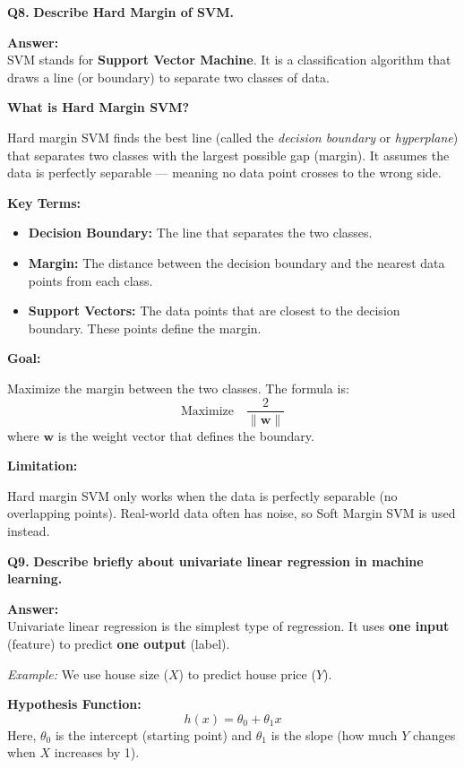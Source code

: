 \documentclass[12pt,a4paper]{article}
\newcommand{\question}[2]{%
    \begin{mdframed}[style=questionstyle]
        \textbf{\textcolor{headerblue}{Q#1.}} \textbf{#2}
    \end{mdframed}%
    \vspace{2pt}%
}
\newcommand{\ans}{\textbf{\textcolor{headerblue}{Answer:}}\\[4pt]}
\newcommand{\subhead}[1]{\textbf{\textcolor{headerblue}{#1}}}
\begin{document}
\vspace{10pt}
\question{8}{Describe Hard Margin of SVM.}

\ans

SVM stands for \textbf{Support Vector Machine}. It is a classification algorithm that draws a line (or boundary) to separate two classes of data.

\subhead{What is Hard Margin SVM?}

Hard margin SVM finds the best line (called the \textit{decision boundary} or \textit{hyperplane}) that separates two classes with the largest possible gap (margin). It assumes the data is perfectly separable --- meaning no data point crosses to the wrong side.

\subhead{Key Terms:}
\begin{itemize}[leftmargin=*]
    \item \textbf{Decision Boundary:} The line that separates the two classes.
    \item \textbf{Margin:} The distance between the decision boundary and the nearest data points from each class.
    \item \textbf{Support Vectors:} The data points that are closest to the decision boundary. These points define the margin.
\end{itemize}

\subhead{Goal:}

Maximize the margin between the two classes. The formula is:
\[
\text{Maximize} \quad \frac{2}{\|\mathbf{w}\|}
\]
where $\mathbf{w}$ is the weight vector that defines the boundary.

\subhead{Limitation:}

Hard margin SVM only works when the data is perfectly separable (no overlapping points). Real-world data often has noise, so Soft Margin SVM is used instead.

\vspace{10pt}
\question{9}{Describe briefly about univariate linear regression in machine learning.}

\ans

Univariate linear regression is the simplest type of regression. It uses \textbf{one input} (feature) to predict \textbf{one output} (label).

\textit{Example:} We use house size ($X$) to predict house price ($Y$).

\subhead{Hypothesis Function:}
\[
h(x) = \theta_0 + \theta_1 x
\]
Here, $\theta_0$ is the intercept (starting point) and $\theta_1$ is the slope (how much $Y$ changes when $X$ increases by 1).
\end{document}
